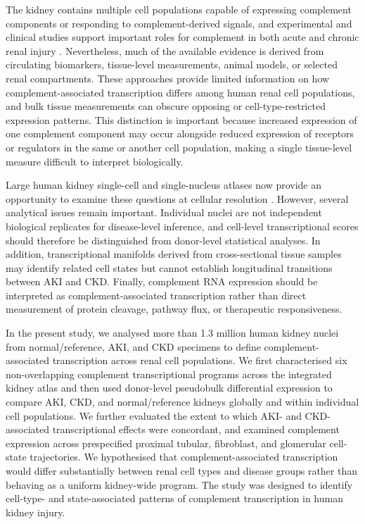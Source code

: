 \documentclass[10pt,letterpaper]{article}
\begin{document}
The kidney contains multiple cell populations capable of expressing complement components or responding to complement-derived signals, and experimental and clinical studies support important roles for complement in both acute and chronic renal injury \cite{willowsRoleComplementKidney2020a,thurmanComplementKidneyOverview2020a}. Nevertheless, much of the available evidence is derived from circulating biomarkers, tissue-level measurements, animal models, or selected renal compartments. These approaches provide limited information on how complement-associated transcription differs among human renal cell populations, and bulk tissue measurements can obscure opposing or cell-type-restricted expression patterns. This distinction is important because increased expression of one complement component may occur alongside reduced expression of receptors or regulators in the same or another cell population, making a single tissue-level measure difficult to interpret biologically.

Large human kidney single-cell and single-nucleus atlases now provide an opportunity to examine these questions at cellular resolution \cite{lakeAtlasHealthyInjured2023}. However, several analytical issues remain important. Individual nuclei are not independent biological replicates for disease-level inference, and cell-level transcriptional scores should therefore be distinguished from donor-level statistical analyses. In addition, transcriptional manifolds derived from cross-sectional tissue samples may identify related cell states but cannot establish longitudinal transitions between AKI and CKD. Finally, complement RNA expression should be interpreted as complement-associated transcription rather than direct measurement of protein cleavage, pathway flux, or therapeutic responsiveness.

In the present study, we analysed more than 1.3 million human kidney nuclei from normal/reference, AKI, and CKD specimens to define complement-associated transcription across renal cell populations. We first characterised six non-overlapping complement transcriptional programs across the integrated kidney atlas and then used donor-level pseudobulk differential expression to compare AKI, CKD, and normal/reference kidneys globally and within individual cell populations. We further evaluated the extent to which AKI- and CKD-associated transcriptional effects were concordant, and examined complement expression across prespecified proximal tubular, fibroblast, and glomerular cell-state trajectories. We hypothesised that complement-associated transcription would differ substantially between renal cell types and disease groups rather than behaving as a uniform kidney-wide program. The study was designed to identify cell-type- and state-associated patterns of complement transcription in human kidney injury.
\end{document}
